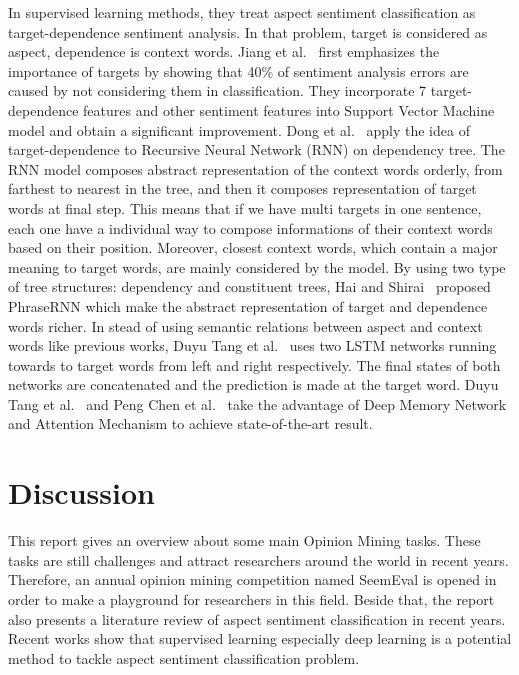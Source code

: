 \documentclass{article}
\begin{document}
In supervised learning methods, they treat aspect sentiment classification as target-dependence sentiment analysis.
In that problem, target is considered as aspect, dependence is context words.
Jiang et al.~\cite{Jiang:2011:TTS:2002472.2002492} first emphasizes the importance of targets by showing that 40\% of sentiment analysis errors are caused by not considering them in classification.
They incorporate 7 target-dependence features and other sentiment features into Support Vector Machine model and obtain a significant improvement.
Dong et al.~\cite{dong2014adaptive} apply the idea of target-dependence to Recursive Neural Network (RNN) on dependency tree.
The RNN model composes abstract representation of the context words orderly, from farthest to nearest in the tree, and then it composes representation of target words at final step.
This means that if we have multi targets in one sentence, each one have a individual way to compose informations of their context words based on their position. 
Moreover, closest context words, which contain a major meaning to target words, are mainly considered by the model.
By using two type of tree structures: dependency and constituent trees, Hai and Shirai~\cite{DBLP:conf/emnlp/NguyenS15} proposed PhraseRNN which make the abstract representation of target and dependence words richer.
In stead of using semantic relations between aspect and context words like previous works, Duyu Tang et al.~\cite{DBLP:journals/corr/TangQFL15} uses two LSTM networks running towards to target words from left and right respectively. 
The final states of both networks are concatenated and the prediction is made at the target word.
Duyu Tang et al.~\cite{DBLP:journals/corr/TangQL16} and Peng Chen et al.~\cite{D17-1048} take the advantage of Deep Memory Network and Attention Mechanism to achieve state-of-the-art result.

\section{Discussion}
\label{sec:disc}
This report gives an overview about some main Opinion Mining tasks.
These tasks are still challenges and attract researchers around the world in recent years.
Therefore, an annual opinion mining competition named SeemEval is opened in order to make a playground for researchers in this field.
Beside that, the report also presents a literature review of aspect sentiment classification in recent years.
Recent works show that supervised learning especially deep learning is a potential method to tackle aspect sentiment classification problem.




\printbibliography

\end{document}

